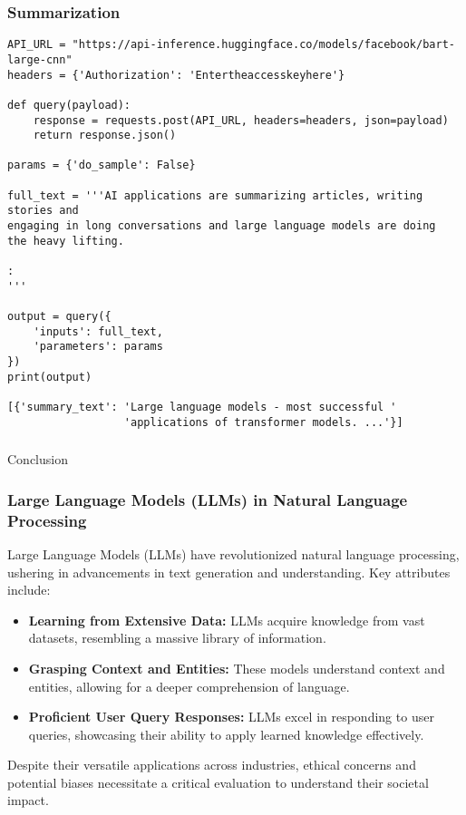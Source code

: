 \begin{frame}[fragile]\frametitle{Summarization}


\begin{lstlisting}
API_URL = "https://api-inference.huggingface.co/models/facebook/bart-large-cnn"
headers = {'Authorization': 'Entertheaccesskeyhere'}

def query(payload):
    response = requests.post(API_URL, headers=headers, json=payload)
    return response.json()
    
params = {'do_sample': False}

full_text = '''AI applications are summarizing articles, writing stories and 
engaging in long conversations and large language models are doing 
the heavy lifting.

:
'''

output = query({
    'inputs': full_text,
    'parameters': params
})
print(output)

[{'summary_text': 'Large language models - most successful '
                  'applications of transformer models. ...'}]
\end{lstlisting}


\end{frame}

\begin{frame}[fragile]\frametitle{}
\begin{center}
{\Large Conclusion}
\end{center}
\end{frame}


\begin{frame}[fragile]\frametitle{Large Language Models (LLMs) in Natural Language Processing}

  Large Language Models (LLMs) have revolutionized natural language processing, ushering in advancements in text generation and understanding. Key attributes include:

  \begin{itemize}
    \item \textbf{Learning from Extensive Data:} LLMs acquire knowledge from vast datasets, resembling a massive library of information.

    \item \textbf{Grasping Context and Entities:} These models understand context and entities, allowing for a deeper comprehension of language.

    \item \textbf{Proficient User Query Responses:} LLMs excel in responding to user queries, showcasing their ability to apply learned knowledge effectively.

  \end{itemize}

  Despite their versatile applications across industries, ethical concerns and potential biases necessitate a critical evaluation to understand their societal impact.

\end{frame}

